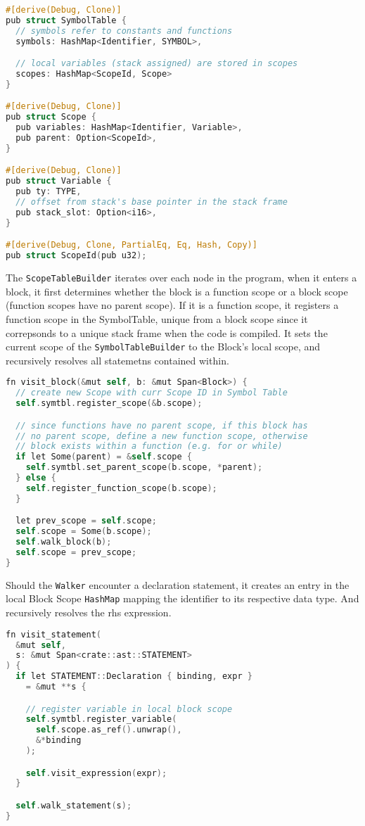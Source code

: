 \begin{lstlisting}[language=C]
#[derive(Debug, Clone)]
pub struct SymbolTable {
  // symbols refer to constants and functions 
  symbols: HashMap<Identifier, SYMBOL>,

  // local variables (stack assigned) are stored in scopes
  scopes: HashMap<ScopeId, Scope>
}

#[derive(Debug, Clone)]
pub struct Scope {
  pub variables: HashMap<Identifier, Variable>,
  pub parent: Option<ScopeId>,
}

#[derive(Debug, Clone)]
pub struct Variable {
  pub ty: TYPE,
  // offset from stack's base pointer in the stack frame
  pub stack_slot: Option<i16>,
}

#[derive(Debug, Clone, PartialEq, Eq, Hash, Copy)]
pub struct ScopeId(pub u32);
\end{lstlisting}

The \texttt{ScopeTableBuilder} iterates over each node in the program, when it enters a block, it first determines whether the block is a function scope or a block scope (function scopes have no parent scope). If it is a function scope, it registers a function scope in the SymbolTable, unique from a block scope since it correpsonds to a unique stack frame when the code is compiled. It sets the current scope of the \texttt{SymbolTableBuilder} to the Block's local scope, and recursively resolves all statemetns contained within.

\begin{lstlisting}[language=C]
fn visit_block(&mut self, b: &mut Span<Block>) {
  // create new Scope with curr Scope ID in Symbol Table
  self.symtbl.register_scope(&b.scope); 

  // since functions have no parent scope, if this block has 
  // no parent scope, define a new function scope, otherwise 
  // block exists within a function (e.g. for or while)
  if let Some(parent) = &self.scope {
    self.symtbl.set_parent_scope(b.scope, *parent);
  } else {
    self.register_function_scope(b.scope);
  }

  let prev_scope = self.scope;
  self.scope = Some(b.scope);
  self.walk_block(b);
  self.scope = prev_scope;
}
\end{lstlisting}

Should the \texttt{Walker} encounter a declaration statement, it creates an entry in the local Block Scope \texttt{HashMap} mapping the identifier to its respective data type. And recursively resolves the rhs expression.

\begin{lstlisting}[language=C]
fn visit_statement(
  &mut self, 
  s: &mut Span<crate::ast::STATEMENT>
) {
  if let STATEMENT::Declaration { binding, expr } 
    = &mut **s {

    // register variable in local block scope
    self.symtbl.register_variable(
      self.scope.as_ref().unwrap(),
      &*binding
    );

    self.visit_expression(expr);
  }

  self.walk_statement(s);
}
\end{lstlisting}

